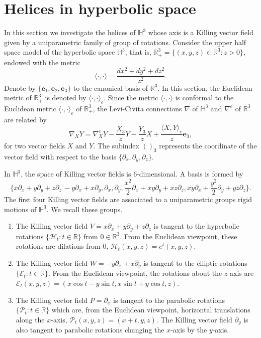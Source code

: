 \documentclass[a4paper,12pt]{amsart}
\theoremstyle{definition}
\def\r{\mathbb R}
\def\h{\mathbb H}
\def\e{\mathbf e}
\begin{document}
  \section{Helices in hyperbolic space}\label{s3}
  In this section we investigate the helices of $\h^3$ whose axis is a Killing vector field given by a uniparametric family of group of rotations.    Consider the upper half space model of the hyperbolic space $\h^3$, that is,   $\r^{3}_+=\{(x,y,z)\in\r^{3}\colon z>0\}$, endowed with the metric
$$\langle\cdot,\cdot\rangle=\frac{dx^2+dy^2+dz^2}{z^2}.$$
 Denote by $\{\e_1,\e_2,\e_3\}$ to the canonical basis of $\r^3$. In this section, the Euclidean metric of $\r^3_{+}$ is denoted by $\langle\cdot,\cdot\rangle_e$. Since   the metric $\langle\cdot,\cdot\rangle$ is conformal to the Euclidean metric $\langle\cdot,\cdot\rangle_e$  of $\r^3_{+}$, the Levi-Civita connections  $\nabla$ of $\h^3$  and $\nabla^e$ of  $\r^3$ are related by
\begin{equation}\label{r}
\nabla_XY=\nabla^e_XY-\frac{X_3}{z}Y-\frac{Y_3}{z}X+\frac{\langle X,Y\rangle_e}{z}\e_3,
\end{equation}
for two vector fields $X$ and $Y$. The  subindex $()_3$ represents the coordinate of the vector field with respect to the basis $\{\partial_x,\partial_y,\partial_z\}$.

In $\h^3$,   the space of Killing vector fields is $6$-dimensional. A basis is formed by 
$$\{ x\partial_x+y\partial_y+z\partial_z\, -y\partial_x+x\partial_y, \partial_x, \partial_y, \frac{x^2}{2}\partial_x+xy\partial_y+xz\partial_z,  xy\partial_x+\frac{y^2}{2}\partial_y+yz\partial_z \}.$$
The first four Killing vector fields are associated to a uniparametric groups rigid motions of $\h^3$. We recall these groups.
\begin{enumerate}
\item The Killing vector field $V=x\partial_x+y\partial_y+z\partial_z$  is tangent to the hyperbolic rotations $\{\mathcal{H}_t\colon t\in\r\}$ from $0\in\r^3$. From the Euclidean viewpoint, these rotations are dilations from $0$, $\mathcal{H}_t(x,y,z)=e^t(x,y,z)$.
\item The Killing vector field $W=-y\partial_x+x\partial_y$ is tangent to the elliptic rotations $\{\mathcal{E}_t\colon t\in\r\}$. From the Euclidean viewpoint, the rotations about the $z$-axis are $\mathcal{E}_t(x,y,z)=(x\cos t-y\sin t,x\sin t+y\cos t,z)$.
\item The Killing vector field $P=\partial_x$ is tangent to the parabolic rotations $\{\mathcal{P}_t\colon t\in\r\}$ which are, from the Euclidean viewpoint, horizontal translations along the $x$-axis, $\mathcal{P}_t(x,y,z)=(x+ t,y,z)$. The Killing vector field $\partial_y$ is also tangent to parabolic rotations changing the $x$-axis by the $y$-axis.
\end{enumerate}
\end{document}
